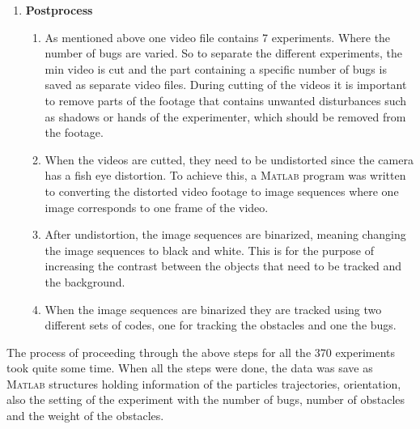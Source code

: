 \begin{enumerate}[label*=\arabic*.]
    
    \item \textbf{Postprocess}
    \begin{enumerate}[label*=\arabic*.]
        \item As mentioned above one video file contains 7 experiments. Where the number of bugs are varied.
            So to separate the different experiments, the  min video is cut and the part 
            containing a specific number of bugs is saved as separate video files. During cutting of the videos 
            it is important to remove parts of the footage that contains unwanted disturbances such 
            as shadows or hands of the experimenter, which should be removed from the footage.
            
        \item When the videos are cutted, they need to be undistorted since the 
            camera has a fish eye distortion. To achieve this, a \textsc{Matlab}\xspace program was  
            written to converting the distorted video footage 
            to image sequences where one image corresponds to one frame of the video.
        
        \item After undistortion, the image sequences are binarized, meaning changing
            the image sequences to black and white. This is for the purpose of 
            increasing the contrast between the objects that need to be tracked and 
            the background.
        
        \item When the image sequences are binarized they are tracked using two different sets 
        of codes, one for tracking the obstacles and one the bugs.
    \end{enumerate}
\end{enumerate}

The process of proceeding through the above steps for all the 370 experiments took quite 
some time. When all the steps were done, the data was save as \textsc{Matlab}\xspace structures 
holding information of the particles trajectories, orientation, also the setting of the experiment 
with the number of bugs, number of obstacles and the weight of the obstacles.
